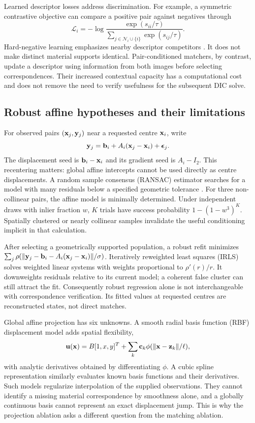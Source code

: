 Learned descriptor losses address discrimination. For example, a symmetric contrastive objective can compare a positive pair against negatives through
\begin{equation}
\mathcal L_i=-\log\frac{\exp(s_{ii}/\tau)}{\sum_{j\in\mathcal N_i\cup\{i\}}\exp(s_{ij}/\tau)}.
\end{equation}
Hard-negative learning emphasizes nearby descriptor competitors \citep{hardnet}. It does not make distinct material supports identical. Pair-conditioned matchers, by contrast, update a descriptor using information from both images before selecting correspondences. Their increased contextual capacity has a computational cost and does not remove the need to verify usefulness for the subsequent DIC solve.

\subsection{Robust affine hypotheses and their limitations}
For observed pairs $(\mathbf x_j,\mathbf y_j)$ near a requested centre $\mathbf x_i$, write
\begin{equation}
\mathbf y_j=\mathbf b_i+A_i(\mathbf x_j-\mathbf x_i)+\boldsymbol\epsilon_j.
\end{equation}
The displacement seed is $\mathbf b_i-\mathbf x_i$ and its gradient seed is $A_i-I_2$. This recentering matters: global affine intercepts cannot be used directly as centre displacements. A random sample consensus (RANSAC) estimator searches for a model with many residuals below a specified geometric tolerance \citep{ransac}. For three non-collinear pairs, the affine model is minimally determined. Under independent draws with inlier fraction $w$, $K$ trials have success probability $1-(1-w^3)^K$. Spatially clustered or nearly collinear samples invalidate the useful conditioning implicit in that calculation.

After selecting a geometrically supported population, a robust refit minimizes $\sum_j\rho(\|\mathbf y_j-\mathbf b_i-A_i(\mathbf x_j-\mathbf x_i)\|/\sigma)$. Iteratively reweighted least squares (IRLS) solves weighted linear systems with weights proportional to $\rho'(r)/r$. It downweights residuals relative to its current model; a coherent false cluster can still attract the fit. Consequently robust regression alone is not interchangeable with correspondence verification. Its fitted values at requested centres are reconstructed states, not direct matches.

Global affine projection has six unknowns. A smooth radial basis function (RBF) displacement model adds spatial flexibility,
\begin{equation}
\mathbf u(\mathbf x)=B[1,x,y]^T+\sum_k\mathbf c_k\phi(\|\mathbf x-\mathbf z_k\|/\ell),
\end{equation}
with analytic derivatives obtained by differentiating $\phi$. A cubic spline representation similarly evaluates known basis functions and their derivatives. Such models regularize interpolation of the supplied observations. They cannot identify a missing material correspondence by smoothness alone, and a globally continuous basis cannot represent an exact displacement jump. This is why the projection ablation asks a different question from the matching ablation.

